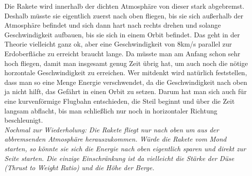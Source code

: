 \documentclass[12pt,paper=A4,numbers=noenddot,bibliography=totoc,listof=totoc,DIV=11,BCOR=1mm]{scrreprt}
\newcommand{\gq}[1]{\glqq #1\grqq} %
\begin{document}
Die Rakete wird innerhalb der dichten Atmosphäre von dieser stark abgebremst. Deshalb müsste sie eigentlich zuerst nach oben fliegen, bis sie sich außerhalb der Atmosphäre befindet und sich dann hart nach \gq{rechts} drehen und solange Geschwindigkeit aufbauen, bis sie sich in einem Orbit befindet. Das geht in der Theorie vielleicht ganz ok, aber eine Geschwindigkeit von 8km/s parallel zur Erdoberfläche zu erreicht braucht lange. Da müsste man am Anfang schon sehr hoch fliegen, damit man insgesamt genug Zeit übrig hat, um auch noch die nötige horzontale Geschwindigkeit zu erreichen.
Wer mitdenkt wird natürlich feststellen, dass man so eine Menge Energie verschwendet, da die Geschwindigkeit nach oben ja nicht hilft, das Gefährt in einen Orbit zu setzen.
Darum hat man sich auch für eine kurvenförmige Flugbahn entschieden, die Steil beginnt und über die Zeit langsam abflacht, bis man schließlich nur noch in horizontaler Richtung beschleunigt.\\
\emph{Nochmal zur Wiederholung: Die Rakete fliegt nur nach oben um aus der abbremsenden Atmosphäre herauszukommen. Würde die Rakete vom Mond starten, so könnte sie sich die Energie nach oben eigentlich sparen und direkt zur Seite starten. Die einzige Einschränkung ist da vielleicht die Stärke der Düse (Thrust to Weight Ratio) und die Höhe der Berge.}\\

\end{document}
